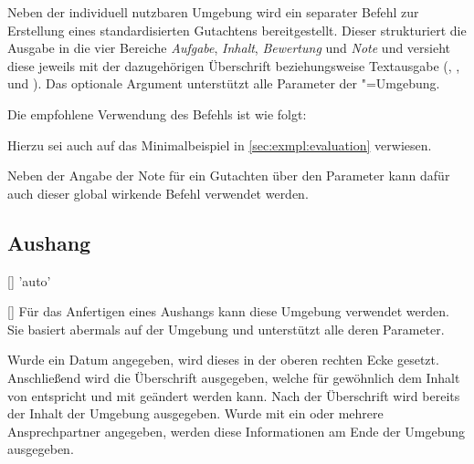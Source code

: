 \begin{Declaration}{\LParameter%
}
\printdeclarationlist%
%
Neben der individuell nutzbaren Umgebung  wird ein 
separater Befehl zur Erstellung eines standardisierten Gutachtens 
bereitgestellt. Dieser strukturiert die Ausgabe in die vier Bereiche 
\emph{Aufgabe}, \emph{Inhalt}, \emph{Bewertung} und \emph{Note} und versieht 
diese jeweils mit der dazugehörigen Überschrift beziehungsweise Textausgabe 
(, ,  und 
). Das optionale Argument unterstützt alle Parameter der 
"=Umgebung.
%
\end{Declaration}
%
\begin{Example}
Die empfohlene Verwendung des Befehls  ist wie folgt:
\begin{Code}[escapechar=§]
\end{Code}
Hierzu sei auch auf das Minimalbeispiel in \autoref{sec:exmpl:evaluation} 
verwiesen.
\end{Example}

\begin{Declaration}{}
\printdeclarationlist%
%
Neben der Angabe der Note für ein Gutachten über den Parameter 
 kann dafür auch dieser global wirkende 
Befehl verwendet werden.
\end{Declaration}


\subsection{Aushang}
\begin{Declaration}{[]}{%
  'auto'%
}
\begin{Declaration}{[]}
\printdeclarationlist%
%
%
Für das Anfertigen eines Aushangs kann diese Umgebung verwendet werden. Sie 
basiert abermals auf der Umgebung  und unterstützt alle 
deren Parameter.

Wurde ein Datum angegeben, wird dieses in der oberen rechten Ecke gesetzt. 
Anschließend wird die Überschrift ausgegeben, welche für gewöhnlich dem Inhalt 
von  entspricht und mit  
geändert werden kann. Nach der Überschrift wird bereits der Inhalt der Umgebung 
ausgegeben. Wurde mit  ein oder mehrere Ansprechpartner 
angegeben, werden diese Informationen am Ende der Umgebung ausgegeben.
\end{Declaration}
\end{Declaration}

